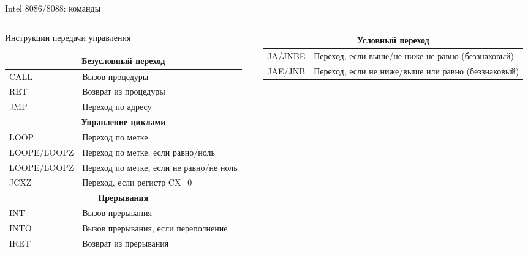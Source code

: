 \documentclass[aspectratio=169,14pt]{beamer}
\begin{document}
\begin{frame}{Intel 8086/8088: команды}
    \begin{columns}[t,onlytextwidth]
        \begin{column}{0.5\textwidth}
            Инструкции передачи управления
            \begin{tiny}
            \begin{tabular}{|p{1.8cm}|p{4.2cm}|}
                \hline
                \multicolumn{2}{|c|}{\textbf{Безусловный переход}} \\ \hline
                CALL & Вызов процедуры \\ \hline
                RET & Возврат из процедуры \\ \hline
                JMP & Переход по адресу \\ \hline
                \multicolumn{2}{|c|}{\textbf{Управление циклами}} \\ \hline
                LOOP & Переход по метке \\ \hline
                LOOPE/LOOPZ & Переход по метке, если равно/ноль \\ \hline
                LOOPE/LOOPZ & Переход по метке, если не равно/не ноль \\ \hline
                JCXZ & Переход, если регистр CX=0 \\ \hline
                \multicolumn{2}{|c|}{\textbf{Прерывания}} \\ \hline
                INT & Вызов прерывания \\ \hline
                INTO & Вызов прерывания, если переполнение \\ \hline
                IRET & Возврат из прерывания \\ \hline
            \end{tabular}
        \end{tiny}
        \end{column}
        \begin{column}{0.5\textwidth}
            \begin{tiny}
            \begin{tabular}{|p{0.9cm}|p{5.4cm}|}
                \hline
                \multicolumn{2}{|c|}{\textbf{Условный переход}} \\ \hline
                JA/JNBE & Переход, если выше/не ниже не равно (беззнаковый)\\ \hline
                JAE/JNB & Переход, если не ниже/выше или равно (беззнаковый)\\ \hline

\end{tabular}
\end{tiny}
\end{column}
\end{columns}
\end{frame}
\end{document}
